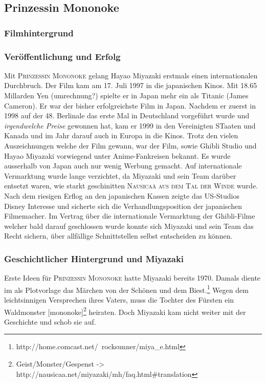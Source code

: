 \subsection{Prinzessin Mononoke}
\subsubsection{Filmhintergrund}
\subsubsection*{Veröffentlichung und Erfolg}
Mit \textsc{Prinzessin Mononoke} gelang Hayao Miyazaki erstmals einen internationalen Durchbruch. Der Film kam am 17. Juli 1997 in die japanischen Kinos. Mit 18.65 Millarden Yen (umrechnung?) spielte er in Japan mehr ein als Titanic (James Cameron). Er war der bisher erfolgreichste Film in Japan. Nachdem er zuerst in 1998 auf der 48. Berlinale das erste Mal in Deutschland vorgeführt wurde und \emph{irgendwelche Preise} gewonnen hat, kam er 1999 in den Vereinigten STaaten und Kanada und im Jahr darauf auch in Europa in die Kinos. Trotz den vielen Auszeichnungen welche der Film gewann, war der Film, sowie Ghibli Studio und Hayao Miyazaki vorwiegend unter Anime-Fankreisen bekannt. Es wurde ausserhalb von Japan auch nur wenig Werbung gemacht. Auf internationale Vermarktung wurde lange verzichtet, da Miyazaki und sein Team darüber entsetzt waren, wie starkt geschinitten \textsc{Nausicaä aus dem Tal der Winde} wurde. Nach dem riesigen Erflog an den japanischen Kassen zeigte das US-Studios Disney Interesse und sicherte sich die Verhandlungsposition der japanischen Filmemacher. Im Vertrag über die internationale Vermarktung der Ghibli-Filme welcher bald darauf geschlossen wurde konnte sich Miyazaki und sein Team das Recht sichern, über allfällige Schnittstellen selbst entscheiden zu können. 

\subsubsection*{Geschichtlicher Hintergrund und Miyazaki}
Erste Ideen für \textsc{Prinzessin Mononoke} hatte Miyazaki bereits 1970. Damals diente im als Plotvorlage das Märchen von der Schönen und dem Biest.\footnote{http://home.comcast.net/~rocksunner/miya\_e.html} Wegen dem leichtsinnigen Versprechen ihres Vaters, muss die Tochter des Fürsten ein Waldmonster [mononoke]\footnote{Geist/Monster/Gespenst -> http://nausicaa.net/miyazaki/mh/faq.html\#translation} heiraten. Doch Miyazaki kam nicht weiter mit der Geschichte und schob sie auf. 

